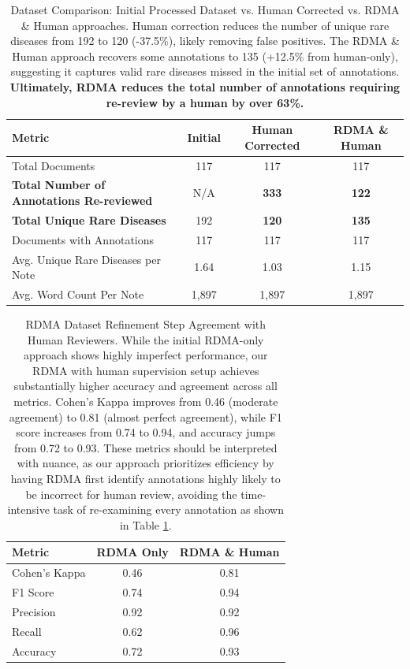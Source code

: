 \begin{table}[h!]
\centering
\begin{tabular}{l c c c}
\hline
\textbf{Metric} & \textbf{Initial} & \textbf{Human Corrected} & \textbf{RDMA \& Human} \\
\hline
Total Documents & 117 & 117 & 117 \\
\textbf{Total Number of Annotations Re-reviewed} & N/A & \textbf{333} & \textbf{122} \\
\textbf{Total Unique Rare Diseases} & 192 & \textbf{120} & \textbf{135} \\
Documents with Annotations & 117 & 117 & 117 \\
Avg. Unique Rare Diseases per Note & 1.64 & 1.03 & 1.15 \\
Avg. Word Count Per Note & 1,897 & 1,897 & 1,897 \\
\hline
\end{tabular}
\caption{Dataset Comparison: Initial Processed Dataset vs. Human Corrected vs. RDMA \& Human approaches. Human correction reduces the number of unique rare diseases from 192 to 120 (-37.5\%), likely removing false positives. The RDMA \& Human approach recovers some annotations to 135 (+12.5\% from human-only), suggesting it captures valid rare diseases missed in the initial set of annotations. \textbf{Ultimately, RDMA reduces the total number of annotations requiring re-review by a human by over 63\%.} }
\label{tab:human_v_rdma&human_stats}
\end{table}


\begin{table}[htbp]
\centering
\begin{tabular}{lcc}
\toprule
\textbf{Metric} & \textbf{RDMA Only} & \textbf{RDMA \& Human} \\
\midrule
Cohen's Kappa & 0.46 & 0.81 \\
F1 Score & 0.74 & 0.94 \\
Precision & 0.92 & 0.92 \\
Recall & 0.62 & 0.96 \\
Accuracy & 0.72 & 0.93 \\
\bottomrule
\end{tabular}
\caption{RDMA Dataset Refinement Step Agreement with Human Reviewers. While the initial RDMA-only approach shows highly imperfect performance, our RDMA with human supervision setup achieves substantially higher accuracy and agreement across all metrics. Cohen's Kappa improves from 0.46 (moderate agreement) to 0.81 (almost perfect agreement), while F1 score increases from 0.74 to 0.94, and accuracy jumps from 0.72 to 0.93. These metrics should be interpreted with nuance, as our approach prioritizes efficiency by having RDMA first identify annotations highly likely to be incorrect for human review, avoiding the time-intensive task of re-examining every annotation as shown in Table \ref{tab:human_v_rdma&human_stats}.}
\label{tab:rdma_agreement}
\end{table}


